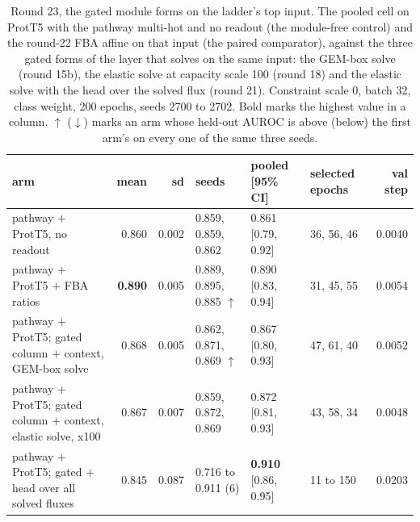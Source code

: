 \begin{table}[H]
  \centering
  \scriptsize
  \setlength{\tabcolsep}{3pt}
  \caption[Round 23, the gated module forms on the ladder's top input]{Round 23, the gated module forms on the ladder's top input. The pooled cell on ProtT5 with the pathway multi-hot and no readout (the module-free control) and the round-22 FBA affine on that input (the paired comparator), against the three gated forms of the layer that solves on the same input: the GEM-box solve (round 15b), the elastic solve at capacity scale 100 (round 18) and the elastic solve with the head over the solved flux (round 21). Constraint scale 0, batch 32, class weight, 200 epochs, seeds 2700 to 2702. Bold marks the highest value in a column. $\uparrow$ ($\downarrow$) marks an arm whose held-out AUROC is above (below) the first arm's on every one of the same three seeds.}
  \label{tab:w39}
  \begin{tabular}{@{}lrrlllr@{}}
    \hline
    arm & mean & sd & seeds & pooled [95\% CI] & selected epochs & val step \\
    \hline
    pathway $+$ ProtT5, no readout & 0.860 & 0.002 & 0.859, 0.859, 0.862 & 0.861 [0.79, 0.92] & 36, 56, 46 & 0.0040 \\
    pathway $+$ ProtT5 $+$ FBA ratios & \textbf{0.890} & 0.005 & 0.889, 0.895, 0.885 $\uparrow$ & 0.890 [0.83, 0.94] & 31, 45, 55 & 0.0054 \\
    pathway $+$ ProtT5; gated column $+$ context, GEM-box solve & 0.868 & 0.005 & 0.862, 0.871, 0.869 $\uparrow$ & 0.867 [0.80, 0.93] & 47, 61, 40 & 0.0052 \\
    pathway $+$ ProtT5; gated column $+$ context, elastic solve, x100 & 0.867 & 0.007 & 0.859, 0.872, 0.869 & 0.872 [0.81, 0.93] & 43, 58, 34 & 0.0048 \\
    pathway $+$ ProtT5; gated $+$ head over all solved fluxes & 0.845 & 0.087 & 0.716 to 0.911 (6) & \textbf{0.910} [0.86, 0.95] & 11 to 150 & 0.0203 \\
    \hline
  \end{tabular}
\end{table}

